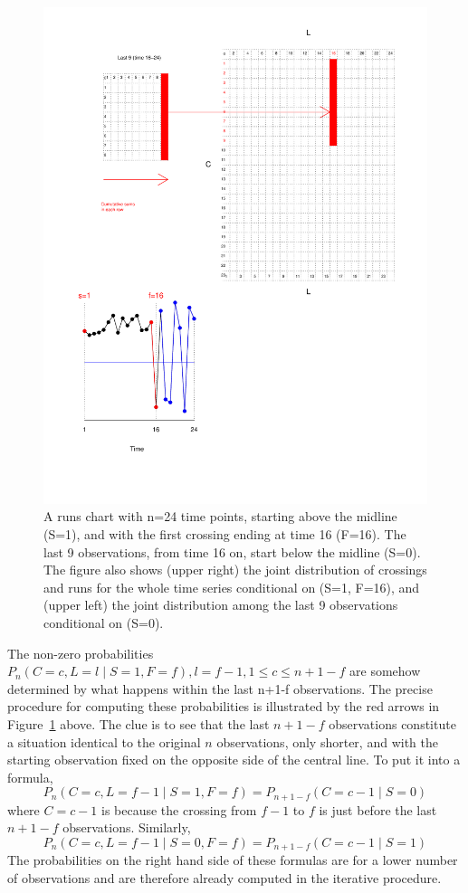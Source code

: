 \begin{figure}[htbp]
  \centering
  \caption{A runs chart with n=24 time points, starting above the 
  midline (S=1), and with the first crossing ending at time 16 (F=16). The last 9 observations, from time 16 on, start below the midline (S=0). The figure also shows (upper right) the joint distribution of crossings and runs for the whole time series conditional on (S=1, F=16), and (upper left) the joint distribution among the last 9 observations conditional on (S=0).}
  \label{figure:rch}
  \includegraphics{run24}
\end{figure}

The non-zero probabilities $P_n (C=c,L=l \mid S=1,F=f), l=f-1, 1 \leq c \leq n+1-f$ are somehow determined by what happens within the last n+1-f observations. The precise procedure for computing these probabilities is illustrated by the red arrows in Figure~\ref{figure:rch} above. The clue is to see that the last $n+1-f$ observations constitute a situation identical to the original $n$ observations, only shorter, and with the starting observation fixed on the opposite side of the central line. To put it into a formula, $$P_n (C=c,L=f-1 \mid S=1,F=f)=P_{n+1-f} (C=c-1 \mid S=0)$$ where $C=c-1$ is because the crossing from $f-1$ to $f$ is just before the last $n+1-f$ observations. Similarly, $$P_n (C=c,L=f-1 \mid S=0,F=f)=P_{n+1-f} (C=c-1 \mid S=1)$$ The probabilities on the right hand side of these formulas are for a lower number of observations and are therefore already computed in the iterative procedure. 

